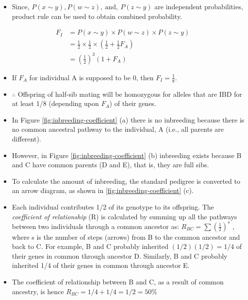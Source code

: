 \documentclass[11pt,dvipsnames,ignorenonframetext,aspectratio=169]{beamer}
\providecommand{\tightlist}{%
  \setlength{\itemsep}{0pt}\setlength{\parskip}{0pt}}
\begin{document}
\begin{frame}{}
\protect\hypertarget{section-2}{}
\begin{itemize}
\tightlist
\item
  Since, \(P(x \sim y), P(w \sim z),~\text{and},~P(z \sim y)\) are
  independent probabilities, product rule can be used to obtain combined
  probability.
\end{itemize}

\[
\begin{aligned}
F_I &= P(x \sim y)\times P(w \sim z) \times P(z \sim y) \\
&= \frac{1}{2} \times \frac{1}{2} \times \left( \frac{1}{2} + \frac{1}{2}F_A \right) \\
&= \left( \frac{1}{2} \right)^3 (1 + F_A)
\end{aligned}
\]

\begin{itemize}
\tightlist
\item
  If \(F_A\) for individual A is supposed to be 0, then
  \(F_I = \frac{1}{8}\).
\item
  \(\therefore\) Offspring of half-sib mating will be homozygous for
  alleles that are IBD for at least 1/8 (depending upon \(F_A\)) of
  their genes.
\end{itemize}
\end{frame}

\begin{frame}{}
\protect\hypertarget{section-3}{}
\begin{itemize}
\tightlist
\item
  In Figure \ref{fig:inbreeding-coefficient} (a) there is no inbreeding
  because there is no common ancestral pathway to the individual, A
  (i.e., all parents are different).
\item
  However, in Figure \ref{fig:inbreeding-coefficient} (b) inbreeding
  exists because B and C have common parents (D and E), that is, they
  are full sibs.
\item
  To calculate the amount of inbreeding, the standard pedigree is
  converted to an arrow diagram, as shown in
  \ref{fig:inbreeding-coefficient} (c).
\item
  Each individual contributes 1/2 of its genotype to its offspring. The
  \emph{coefficient of relationship} (R) is calculated by summing up all
  the pathways between two individuals through a common ancestor as:
  \(R_{BC} = \sum{\left(\frac{1}{2}\right)^s}\) , where s is the number
  of steps (arrows) from B to the common ancestor and back to C. For
  example, B and C probably inherited \((1/2)(1/2) = 1/4\) of their
  genes in common through ancestor D. Similarly, B and C probably
  inherited 1/4 of their genes in common through ancestor E.
\item
  The coefficient of relationship between B and C, as a result of common
  ancestry, is hence \(R_{BC} = 1/4 + 1/4 = 1/2 = 50\%\)
\end{itemize}
\end{frame}
\end{document}

